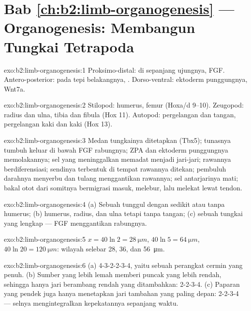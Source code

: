\section*{Bab \ref{ch:b2:limb-organogenesis} --- Organogenesis: Membangun Tungkai Tetrapoda}

\begin{solution}{exo:b2:limb-organogenesis:1}
Proksimo-distal:  di sepanjang ujungnya, FGF.
Antero-posterior:  pada tepi belakangnya,
. Dorso-ventral: ektoderm punggungnya, Wnt7a.
\end{solution}

\begin{solution}{exo:b2:limb-organogenesis:2}
Stilopod: humerus, femur (Hoxa/d 9--10). Zeugopod: radius dan ulna,
tibia dan fibula (Hox 11). Autopod: pergelangan dan tangan, pergelangan
kaki dan kaki (Hox 13).
\end{solution}

\begin{solution}{exo:b2:limb-organogenesis:3}
Medan tungkainya ditetapkan (Tbx5); tunasnya tumbuh keluar di bawah FGF
rabungnya; ZPA dan ektoderm punggungnya memolakannya; sel yang
meninggalkan  memadat menjadi jari-jari; rawannya
berdiferensiasi; sendinya terbentuk di tempat rawannya ditekan;
pembuluh darahnya menyerbu dan tulang menggantikan rawannya; sel
antarjarinya mati; bakal otot dari somitnya bermigrasi masuk, melebur,
lalu melekat lewat tendon.
\end{solution}

\begin{solution}{exo:b2:limb-organogenesis:4}
(a) Sebuah tunggul dengan sedikit atau tanpa humerus; (b) humerus,
radius, dan ulna tetapi tanpa tangan; (c) sebuah tungkai yang lengkap
--- FGF menggantikan rabungnya.
\end{solution}

\begin{solution}{exo:b2:limb-organogenesis:5}
$x = 40\ln 2 = \qty{28}{\micro m}$, $40\ln 5 = \qty{64}{\micro m}$,
$40\ln 20 = \qty{120}{\micro m}$: wilayah selebar 28, 36, dan
\qty{56}{\micro m}.
\end{solution}

\begin{solution}{exo:b2:limb-organogenesis:6}
(a) 4-3-2-2-3-4, yaitu sebuah perangkat cermin yang penuh. (b) Sumber
yang lebih lemah memberi puncak yang lebih rendah, sehingga hanya jari
berambang rendah yang ditambahkan: 2-2-3-4. (c) Paparan yang pendek
juga hanya menetapkan jari tambahan yang paling depan: 2-2-3-4 ---
selnya mengintegralkan kepekatannya sepanjang waktu.
\end{solution}

